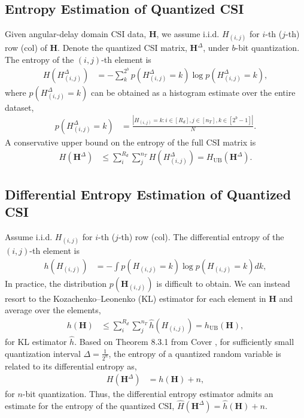 \subsection{Entropy Estimation of Quantized CSI} \label{sec:ent_est_quant}

Given angular-delay domain CSI data, $\mathbf H$, we assume i.i.d. $H_{(i,j)}$ for $i$-th ($j$-th) row (col) of $\mathbf H$.
Denote the quantized CSI matrix, $\mathbf H^\Delta$, under $b$-bit quantization. The entropy of the $(i,j)$-th element is
\begin{align*}
H(H^\Delta_{(i,j)}) &= - \sum_{k}^{2^b} p(H^\Delta_{(i,j)} = k) \log p(H^\Delta_{(i,j)} = k),
\end{align*}
where $p(H^\Delta_{(i,j)} = k)$ can be obtained as a histogram estimate over the entire dataset,
\begin{align*}
	p(H^\Delta_{(i,j)} = k) &= \frac{| H_{(i,j)}=k:i\in[R_d],j\in[n_T],k\in[2^b-1]|}{N}.
\end{align*}
A conservative upper bound on the entropy of the full CSI matrix is
\begin{align}
H(\mathbf H^\Delta) &\leq \sum_{i}^{R_d}\sum_{j}^{n_T} H(H^\Delta_{(i,j)}) = H_{\text{UB}}(\mathbf H^\Delta). \label{eq:csi-ent}
\end{align}

\subsection{Differential Entropy Estimation of Quantized CSI} \label{sec:diffent_est_quant}

Assume i.i.d. $H_{(i,j)}$ for $i$-th ($j$-th) row (col). The differential entropy of the $(i,j)$-th element is
\begin{align*}
	h( H_{(i,j)}) &= - \int p(H_{(i,j)} = k) \log p(H_{(i,j)} = k) dk,
\end{align*}
In practice, the distribution $p(\mathbf H_{(i,j)})$ is difficult to obtain. We can instead resort to the Kozachenko–Leonenko (KL) estimator \cite{ref:Kozachenko1987SampleEstimate} for each element in $\mathbf H$ and average over the elements,
\begin{align}
	h(\mathbf H) &\leq \sum_{i}^{R_d}\sum_{j}^{n_T} \hat h( H_{(i,j)}) = h_{\text{UB}}(\mathbf H), \label{eq:csi-diff-ent}
\end{align}
for KL estimator $\hat h$. Based on Theorem 8.3.1 from Cover \cite{ref:Cover1999Elements}, for sufficiently small quantization interval $\Delta = \frac {1}{2^n}$, the entropy of a quantized random variable is related to its differential entropy as,
\begin{align}
  H(\mathbf H^{\Delta}) &= h(\mathbf H) + n, \label{eq:cover-thm}
\end{align}
for $n$-bit quantization. Thus, the differential entropy estimator admits an estimate for the entropy of the quantized CSI, $\hat H({\mathbf H}^\Delta) = \hat h(\mathbf H) + n$.

